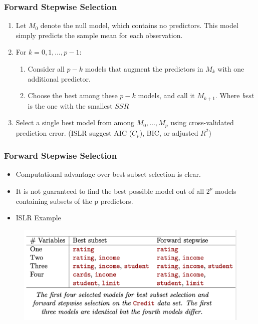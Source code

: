 \documentclass[
  shownotes,
  xcolor={svgnames},
  hyperref={colorlinks,citecolor=DarkBlue,linkcolor=DarkRed,urlcolor=DarkBlue}
  , aspectratio=169]{beamer}
\begin{document}
\begin{frame}[fragile]
\frametitle{Forward Stepwise Selection}

\begin{enumerate}
\item Let $M_0$ denote the null model, which contains no predictors. This model simply predicts the sample mean for each observation.
\bigskip

\item  For $k=0,1,\dots,p-1$:
\medskip
\begin{enumerate}
\item Consider all $p-k$  models that augment the predictors in $M_k$ with one additional predictor.
\medskip
\item Choose the best among these $p - k$ models, and call it $M_{k+1}$. Where {\it best} is the one with the smallest $SSR$
\end{enumerate}
\bigskip
\item Select a single best model from among $M_0,\dots, M_p$ using cross-validated prediction error. (ISLR suggest AIC ($C_p$), BIC, or adjusted $R^2$)
\end{enumerate}

\end{frame}
\begin{frame}[fragile]
\frametitle{Forward Stepwise Selection}


\begin{itemize}
\item Computational advantage over best subset selection is clear.
\item  It is not guaranteed to find the best possible model out of all $2^p$ models containing subsets of the p predictors. 
\item ISLR Example
\end{itemize}

\begin{figure}[H] \centering
            \captionsetup{justification=centering}
              \includegraphics[scale=0.4]{figures/Fig2}
 \end{figure}
\end{frame}
\end{document}
